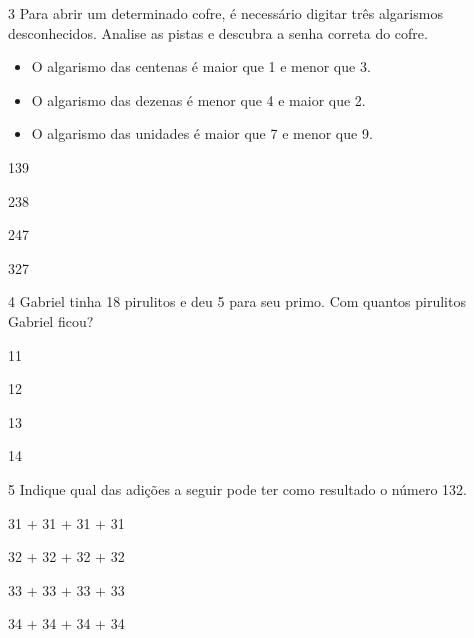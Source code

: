 \num{3} Para abrir um determinado cofre, é necessário digitar três algarismos
desconhecidos. Analise as pistas e descubra a senha correta do cofre.

\begin{itemize}
\item
  O algarismo das centenas é maior que 1 e menor que 3.
\item
  O algarismo das dezenas é menor que 4 e maior que 2.
\item
  O algarismo das unidades é maior que 7 e menor que 9.
\end{itemize}


\begin{escolha}[itemsep=-5pt]
\item 139

\item 238

\item 247

\item 327
\end{escolha}

\num{4} Gabriel tinha 18 pirulitos e deu 5 para seu primo. Com quantos
pirulitos Gabriel ficou?

\begin{escolha}[itemsep=-5pt]
\item 11

\item 12

\item 13

\item 14
\end{escolha}

\num{5} Indique qual das adições a seguir pode ter como resultado o número 132.

\begin{escolha}[itemsep=-5pt]
\item 31 + 31 + 31 + 31

\item 32 + 32 + 32 + 32

\item 33 + 33 + 33 + 33

\item 34 + 34 + 34 + 34
\end{escolha}

